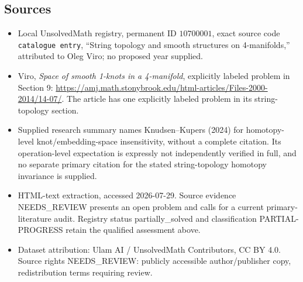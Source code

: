 \documentclass[11pt]{article}
\begin{document}
\subsection{Sources}
\begin{itemize}
\item Local UnsolvedMath registry, permanent ID \(10700001\), exact source code \texttt{catalogue entry}, ``String topology and smooth structures on 4-manifolds,'' attributed to Oleg Viro; no proposed year supplied.
\item Viro, \emph{Space of smooth 1-knots in a 4-manifold}, explicitly labeled problem in Section 9: \url{https://amj.math.stonybrook.edu/html-articles/Files-2000-2014/14-07/}. The article has one explicitly labeled problem in its string-topology section.
\item Supplied research summary names Knudsen--Kupers (2024) for homotopy-level knot/embedding-space insensitivity, without a complete citation. Its operation-level expectation is expressly not independently verified in full, and no separate primary citation for the stated string-topology homotopy invariance is supplied.
\item HTML-text extraction, accessed 2026-07-29. Source evidence NEEDS\_REVIEW presents an open problem and calls for a current primary-literature audit. Registry status partially\_solved and classification PARTIAL-PROGRESS retain the qualified assessment above.
\item Dataset attribution: Ulam AI / UnsolvedMath Contributors, CC BY 4.0. Source rights NEEDS\_REVIEW: publicly accessible author/publisher copy, redistribution terms requiring review.
\end{itemize}
\end{document}
